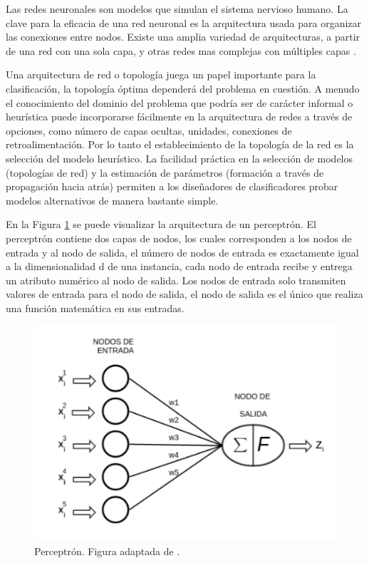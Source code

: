 Las redes neuronales son modelos que simulan el sistema nervioso humano. La clave para la eficacia de una red neuronal es la arquitectura usada para organizar las conexiones entre nodos. Existe una amplia variedad de arquitecturas, a partir de una red con una sola capa, y otras redes mas complejas con múltiples capas \cite{aggarwal2015data, TheNNBook}.   

 Una arquitectura de red o topología juega un papel importante para la clasificación, la topología óptima dependerá del problema en cuestión. A menudo el conocimiento del dominio del problema que podría ser de carácter informal o heurística puede incorporarse fácilmente en la arquitectura de redes a través de opciones, como número de capas ocultas, unidades, conexiones de retroalimentación. Por lo tanto el establecimiento de la topología de la red es la selección del modelo heurístico. La facilidad práctica en la selección de modelos (topologías de red) y la estimación de parámetros (formación a través de propagación hacia atrás) permiten a los diseñadores de clasificadores probar modelos alternativos de manera bastante simple. \cite{PattClassi, TheNNBook}


En la Figura \ref{fig:perceptron} se puede visualizar la arquitectura de un perceptrón. El perceptrón contiene dos capas de nodos, los cuales corresponden a los nodos de entrada y al nodo de salida, el número de nodos de entrada es exactamente igual a la dimensionalidad d de una instancia, cada nodo de entrada recibe y entrega un atributo numérico al nodo de salida. Los nodos de entrada solo transmiten valores de entrada para el nodo de salida, el nodo de salida es el único que realiza una función matemática en sus entradas.
\begin{figure}[ht]
 \centering
	\includegraphics[width=0.6\columnwidth]{chapter3/perceptron.png}
 \caption{Perceptrón. Figura adaptada de \cite{TheNNBook}.}
 \label{fig:perceptron}
\end{figure}

